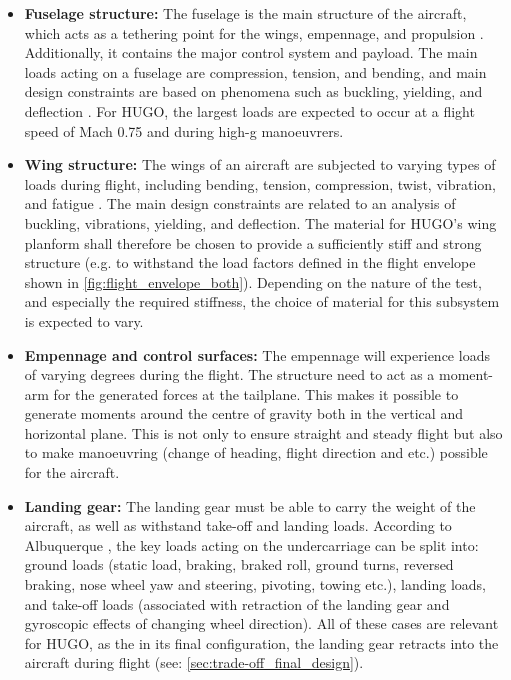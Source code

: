  
\begin{itemize}
    \item \textbf{Fuselage structure:}
    The fuselage is the main structure of the aircraft, which acts as a tethering point for the wings, empennage, and propulsion \cite{CHATTERJEE2019199}. Additionally, it contains the major control system and payload. The main loads acting on a fuselage are compression, tension, and bending, and main design constraints are based on phenomena such as buckling, yielding, and deflection \cite{Arnold2012MaterialsSelection}. For HUGO, the largest loads are expected to occur at a flight speed of Mach 0.75 and during high-g manoeuvrers. 
    
    \item \textbf{Wing structure:} The wings of an aircraft are subjected to varying types of loads during flight, including bending, tension, compression, twist, vibration, and fatigue \cite{Arnold2012MaterialsSelection}. The main design constraints are related to an analysis of buckling, vibrations, yielding, and deflection. The material for HUGO's wing planform shall therefore be chosen to provide a sufficiently stiff and strong structure (e.g. to withstand the load factors defined in the flight envelope shown in \autoref{fig:flight_envelope_both}). Depending on the nature of the test, and especially the required stiffness, the choice of material for this subsystem is expected to vary.

    \item \textbf{Empennage and control surfaces:} The empennage will experience loads of varying degrees during the flight. The structure need to act as a moment-arm for the generated forces at the tailplane. This makes it possible to generate moments around the centre of gravity both in the vertical and horizontal plane. This is not only to ensure straight and steady flight but also to make manoeuvring (change of heading, flight direction and etc.) possible for the aircraft.   

    
    \item \textbf{Landing gear:} 
    The landing gear must be able to carry the weight of the aircraft, as well as withstand take-off and landing loads. According to Albuquerque \cite{structural_loads_handbook}, the key loads acting on the undercarriage can be split into: ground loads (static load, braking, braked roll, ground turns, reversed braking, nose wheel yaw and steering, pivoting, towing etc.), landing loads, and take-off loads (associated with retraction of the landing gear and gyroscopic effects of changing wheel direction). All of these cases are relevant for HUGO, as the in its final configuration, the landing gear retracts into the aircraft during flight (see: \autoref{sec:trade-off_final_design}).  


\end{itemize}
